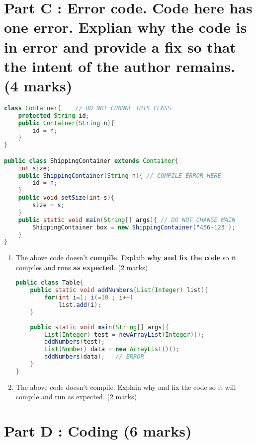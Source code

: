 \documentclass{article}
\begin{document}
\section{Part C : Error code. Code here has one error. Explian why the code is in error  and provide a fix so that the intent of the author remains. (4 marks)}
\begin{lstlisting}[language=Java, left=numbers]
class Container{	// DO NOT CHANGE THIS CLASS
	protected String id;
	public Container(String n){
		id = n;	
	}
}

public class ShippingContainer extends Container{
	int size;
	public ShippingContainer(String n){	// COMPILE ERROR HERE
		id = n;
	}
	public void setSize(int s){
		size = s;
	}
	public static void main(String[] args){	// DO NOT CHANGE MAIN
		ShippingContainer box = new ShippingContainer("456-123");
	}
}
\end{lstlisting}
\begin{enumerate}
	\item The above code doesn't \underline{\textbf{compile}}. Explaib \textbf{why and fix the code} so it compiles and runs \textbf{as expected}. (2 marks)
	\begin{lstlisting}[language=Java, left=numbers]
public class Table{
	public static void addNumbers(List(Integer) list){
		for(int i=1; i(=10 ; i++)
			list.add(i);
	}
	
	public static void main(String[] args){
		List(Integer) test = newArrayList(Integer)();
		addNumbers(test);
		List(Number) data = new ArrayList()();
		addNumbers(data);	// ERROR
	}
}
	\end{lstlisting}
	\item The above code doesn't compile. Explain why and fix the code so it will compile and run as expected. (2 marks)
\end{enumerate}

\section{Part D : Coding (6 marks)}
\end{document}

